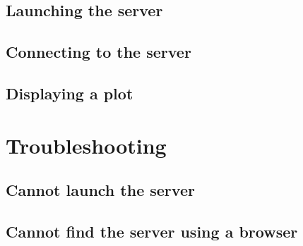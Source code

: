 \documentclass{article}
\begin{document}
\subsection{Launching the server}
\subsection{Connecting to the server}
\subsection{Displaying a plot}

\section{Troubleshooting}
\subsection{Cannot launch the server}
\subsection{Cannot find the server using a browser}




\begin{thebibliography}{9}
\end{thebibliography}
\end{document}
